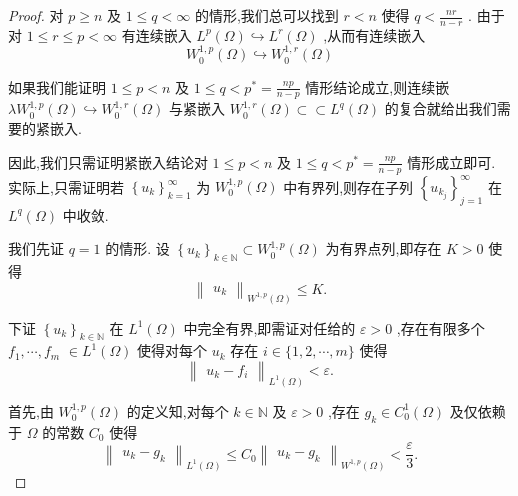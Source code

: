 \documentclass[lang=cn,newtx,10pt,scheme=chinese,thmcnt=chapter]{elegantbook}
\begin{document}
\begin{proof}
     对 \(p \geq  n\) 及 \(1 \leqslant  q < \infty\) 的情形,我们总可以找到 \(r < n\) 使得 \(q < \frac{nr}{n - r}\) . 由于对 \(1 \leqslant  r \leqslant  p < \infty\) 有连续嵌入 \({L}^{p}\left( \Omega \right)  \hookrightarrow  {L}^{r}\left( \Omega \right)\) ,从而有连续嵌入
\begin{equation*}
{W}_{0}^{1,p}\left( \Omega \right)  \hookrightarrow  {W}_{0}^{1,r}\left( \Omega \right)
\end{equation*}

如果我们能证明 \(1 \leqslant  p < n\) 及 \(1 \leqslant  q < {p}^{ * } = \frac{np}{n - p}\) 情形结论成立,则连续嵌 \(\lambda {W}_{0}^{1,p}\left( \Omega \right)  \hookrightarrow  {W}_{0}^{1,r}\left( \Omega \right)\) 与紧嵌入 \({W}_{0}^{1,r}\left( \Omega \right)  \subset   \subset  {L}^{q}\left( \Omega \right)\) 的复合就给出我们需要的紧嵌入.

因此,我们只需证明紧嵌入结论对 \(1 \leqslant  p < n\) 及 \(1 \leqslant  q < {p}^{ * } = \frac{np}{n - p}\) 情形成立即可. 实际上,只需证明若 \({\left\{  {u}_{k}\right\}  }_{k = 1}^{\infty }\) 为 \({W}_{0}^{1,p}\left( \Omega \right)\) 中有界列,则存在子列 \({\left\{  {u}_{{k}_{j}}\right\}  }_{j = 1}^{\infty }\) 在 \({L}^{q}\left( \Omega \right)\) 中收敛.

我们先证 \(q = 1\) 的情形. 设 \({\left\{  {u}_{k}\right\}  }_{k \in  \mathbb{N}} \subset  {W}_{0}^{1,p}\left( \Omega \right)\) 为有界点列,即存在 \(K > 0\) 使得
\begin{equation}
{\begin{Vmatrix}{u}_{k}\end{Vmatrix}}_{{W}^{1,p}\left( \Omega \right) } \leqslant  K. \label{3.45}
\end{equation}

下证 \({\left\{  {u}_{k}\right\}  }_{k \in  \mathbb{N}}\) 在 \({L}^{1}\left( \Omega \right)\) 中完全有界,即需证对任给的 \(\varepsilon  > 0\) ,存在有限多个 \({f}_{1},\cdots ,{f}_{m}\)  \(\in  {L}^{1}\left( \Omega \right)\) 使得对每个 \({u}_{k}\) 存在 \(i \in  \{ 1,2,\cdots ,m\}\) 使得
\begin{equation}
{\begin{Vmatrix}{u}_{k} - {f}_{i}\end{Vmatrix}}_{{L}^{1}\left( \Omega \right) } < \varepsilon . \label{3.46}
\end{equation}

首先,由 \({W}_{0}^{1,p}\left( \Omega \right)\) 的定义知,对每个 \(k \in  \mathbb{N}\) 及 \(\varepsilon  > 0\) ,存在 \({g}_{k} \in  {C}_{0}^{1}\left( \Omega \right)\) 及仅依赖于 \(\Omega\) 的常数 \({C}_{0}\) 使得
\begin{equation}
{\begin{Vmatrix}{u}_{k} - {g}_{k}\end{Vmatrix}}_{{L}^{1}\left( \Omega \right) } \leqslant  {C}_{0}{\begin{Vmatrix}{u}_{k} - {g}_{k}\end{Vmatrix}}_{{W}^{1,p}\left( \Omega \right) } < \frac{\varepsilon }{3}. \label{3.47}
\end{equation}


\end{proof}
\end{document}
